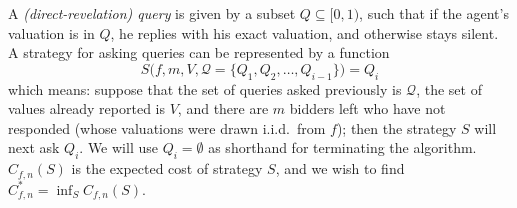 \begin{definition}\label{def:query}
  A {\em (direct-revelation) query} is given by a subset $Q \subseteq
  [0,1)$, such that if the agent's valuation is in $Q$, he replies with his
  exact valuation, and otherwise stays silent.  
A strategy for asking queries can be represented by a function
\begin{displaymath}
	S\big(f, m, V, \mathcal Q = \{Q_1, Q_2, \ldots, Q_{i-1} \}\big) = Q_i
\end{displaymath}
which means: 
suppose that the set of queries asked previously is
$\mathcal Q$, the set of values already reported is $V$, and there are $m$
bidders left who have not responded (whose valuations were drawn
i.i.d.~from $f$); then the strategy $S$ will next ask $Q_i$.
We will use $Q_i = \emptyset$ as shorthand for terminating the algorithm.
$C_{f,n}(S)$ is the expected cost of strategy $S$, and we wish to find
$C_{f,n}^* = \inf_S C_{f,n}(S)$.
\end{definition}

